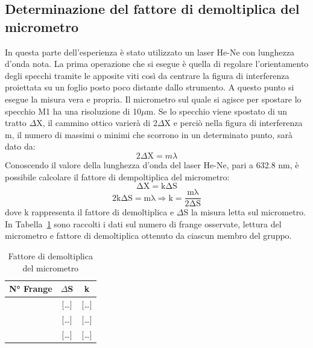 \documentclass[10pt,a4paper]{article}
\newcommand{\rem}[1]{[\emph{#1}]}
\begin{document}
 \subsection*{Determinazione del fattore di demoltiplica del micrometro}
 In questa parte dell'esperienza è stato utilizzato un laser He-Ne con lunghezza d'onda nota. La prima operazione che si esegue è quella di regolare l'orientamento degli specchi tramite le apposite viti così da centrare la figura di interferenza proiettata su un foglio posto poco distante dallo strumento. A questo punto si esegue la misura vera e propria.\newline
 Il micrometro sul quale si agisce per spostare lo specchio M1 ha una risoluzione di 10$\mu$m. Se lo specchio viene spostato di un tratto $\Delta$X, il cammino ottico varierà di 2$\Delta$X e perciò nella figura di interferenza m, il numero di massimi o minimi che scorrono in un determinato punto, sarà dato da:
\begin{equation*}
2\Delta\mathrm{X} = m\lambda
\end{equation*}
Conoscendo il valore della lunghezza d'onda del laser He-Ne, pari a 632.8 nm, è possibile calcolare il fattore di dempoltiplica del micrometro:
\begin{equation*}
\mathrm{\Delta X = k\Delta S}
\end{equation*}
\begin{equation*}
\mathrm{2k\Delta S = m\lambda} \Rightarrow \mathrm{k = \frac{m\lambda}{2\Delta S}}
\end{equation*}
dove k rappresenta il fattore di demoltiplica e $\Delta$S la misura letta sul micrometro. 
\newpage
\noindent In Tabella~\ref{tab:dem} sono raccolti i dati sul numero di frange osservate, lettura del micrometro e fattore di demoltiplica ottenuto da ciascun membro del gruppo.
\begin{table}[h!]
	\centering
	\caption{Fattore di demoltiplica del micrometro}
	\vspace{1mm}
	\begin{tabular}{ccc}
	\hline
	N° Frange & $\Delta$S & k \\ 
	\hline \hline
	\rem{\dots} & \rem{\dots} & \rem{\dots} \\
	\rem{\dots} & \rem{\dots} & \rem{\dots} \\
	\rem{\dots} & \rem{\dots} & \rem{\dots} \\
	\hline
	\end{tabular}
	\label{tab:dem}
\end{table} 
\end{document}
